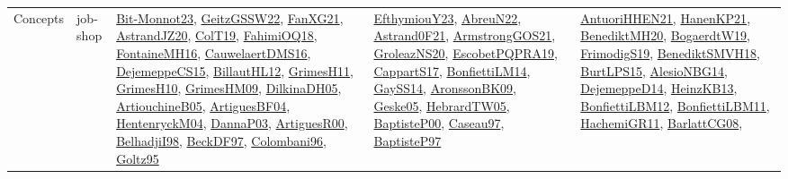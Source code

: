 {\begin{longtable}{lp{3cm}>{\raggedright}p{6cm}>{\raggedright}p{6cm}p{8cm}}
Concepts & job-shop & \href{papers/Bit-Monnot23.pdf}{Bit-Monnot23}\cite{Bit-Monnot23}, \href{papers/GeitzGSSW22.pdf}{GeitzGSSW22}\cite{GeitzGSSW22}, \href{articles/FanXG21.pdf}{FanXG21}\cite{FanXG21}, \href{articles/AstrandJZ20.pdf}{AstrandJZ20}\cite{AstrandJZ20}, \href{papers/ColT19.pdf}{ColT19}\cite{ColT19}, \href{articles/FahimiOQ18.pdf}{FahimiOQ18}\cite{FahimiOQ18}, \href{papers/FontaineMH16.pdf}{FontaineMH16}\cite{FontaineMH16}, \href{papers/CauwelaertDMS16.pdf}{CauwelaertDMS16}\cite{CauwelaertDMS16}, \href{papers/DejemeppeCS15.pdf}{DejemeppeCS15}\cite{DejemeppeCS15}, \href{papers/BillautHL12.pdf}{BillautHL12}\cite{BillautHL12}, \href{papers/GrimesH11.pdf}{GrimesH11}\cite{GrimesH11}, \href{papers/GrimesH10.pdf}{GrimesH10}\cite{GrimesH10}, \href{papers/GrimesHM09.pdf}{GrimesHM09}\cite{GrimesHM09}, \href{papers/DilkinaDH05.pdf}{DilkinaDH05}\cite{DilkinaDH05}, \href{papers/ArtiouchineB05.pdf}{ArtiouchineB05}\cite{ArtiouchineB05}, \href{papers/ArtiguesBF04.pdf}{ArtiguesBF04}\cite{ArtiguesBF04}, \href{papers/HentenryckM04.pdf}{HentenryckM04}\cite{HentenryckM04}, \href{papers/DannaP03.pdf}{DannaP03}\cite{DannaP03}, \href{articles/ArtiguesR00.pdf}{ArtiguesR00}\cite{ArtiguesR00}, \href{articles/BelhadjiI98.pdf}{BelhadjiI98}\cite{BelhadjiI98}, \href{papers/BeckDF97.pdf}{BeckDF97}\cite{BeckDF97}, \href{papers/Colombani96.pdf}{Colombani96}\cite{Colombani96}, \href{papers/Goltz95.pdf}{Goltz95}\cite{Goltz95} & \href{papers/EfthymiouY23.pdf}{EfthymiouY23}\cite{EfthymiouY23}, \href{articles/AbreuN22.pdf}{AbreuN22}\cite{AbreuN22}, \href{papers/Astrand0F21.pdf}{Astrand0F21}\cite{Astrand0F21}, \href{papers/ArmstrongGOS21.pdf}{ArmstrongGOS21}\cite{ArmstrongGOS21}, \href{papers/GroleazNS20.pdf}{GroleazNS20}\cite{GroleazNS20}, \href{articles/EscobetPQPRA19.pdf}{EscobetPQPRA19}\cite{EscobetPQPRA19}, \href{papers/CappartS17.pdf}{CappartS17}\cite{CappartS17}, \href{papers/BonfiettiLM14.pdf}{BonfiettiLM14}\cite{BonfiettiLM14}, \href{papers/GaySS14.pdf}{GaySS14}\cite{GaySS14}, \href{papers/AronssonBK09.pdf}{AronssonBK09}\cite{AronssonBK09}, \href{papers/Geske05.pdf}{Geske05}\cite{Geske05}, \href{papers/HebrardTW05.pdf}{HebrardTW05}\cite{HebrardTW05}, \href{articles/BaptisteP00.pdf}{BaptisteP00}\cite{BaptisteP00}, \href{papers/Caseau97.pdf}{Caseau97}\cite{Caseau97}, \href{papers/BaptisteP97.pdf}{BaptisteP97}\cite{BaptisteP97} & \href{papers/AntuoriHHEN21.pdf}{AntuoriHHEN21}\cite{AntuoriHHEN21}, \href{papers/HanenKP21.pdf}{HanenKP21}\cite{HanenKP21}, \href{articles/BenediktMH20.pdf}{BenediktMH20}\cite{BenediktMH20}, \href{papers/BogaerdtW19.pdf}{BogaerdtW19}\cite{BogaerdtW19}, \href{papers/FrimodigS19.pdf}{FrimodigS19}\cite{FrimodigS19}, \href{papers/BenediktSMVH18.pdf}{BenediktSMVH18}\cite{BenediktSMVH18}, \href{papers/BurtLPS15.pdf}{BurtLPS15}\cite{BurtLPS15}, \href{papers/AlesioNBG14.pdf}{AlesioNBG14}\cite{AlesioNBG14}, \href{papers/DejemeppeD14.pdf}{DejemeppeD14}\cite{DejemeppeD14}, \href{papers/HeinzKB13.pdf}{HeinzKB13}\cite{HeinzKB13}, \href{papers/BonfiettiLBM12.pdf}{BonfiettiLBM12}\cite{BonfiettiLBM12}, \href{papers/BonfiettiLBM11.pdf}{BonfiettiLBM11}\cite{BonfiettiLBM11}, \href{articles/HachemiGR11.pdf}{HachemiGR11}\cite{HachemiGR11}, \href{papers/BarlattCG08.pdf}{BarlattCG08}\cite{BarlattCG08}, 
\end{longtable}}
